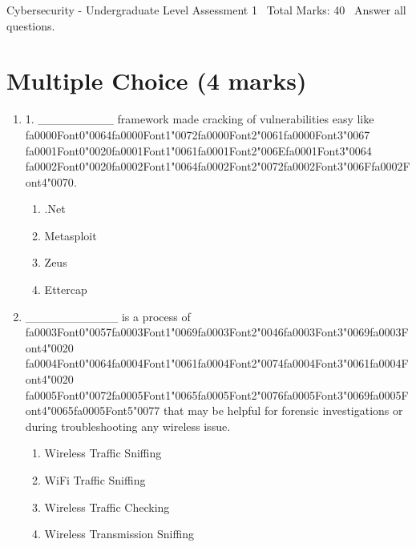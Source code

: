 \documentclass[12pt]{article}
\begin{document}
\begin{center}
Cybersecurity - Undergraduate Level Assessment 1 \
Total Marks: 40 \
Answer all questions.
\end{center}

\section*{Multiple Choice (4 marks)}
\begin{enumerate}[label=\arabic*.]
\item 1. \_\_\_\_\_\_\_\_\_ framework made cracking of vulnerabilities easy like {\csname fa0000Font0\endcsname\char"0064}{\csname fa0000Font1\endcsname\char"0072}{\csname fa0000Font2\endcsname\char"0061}{\csname fa0000Font3\endcsname\char"0067} {\csname fa0001Font0\endcsname\char"0020}{\csname fa0001Font1\endcsname\char"0061}{\csname fa0001Font2\endcsname\char"006E}{\csname fa0001Font3\endcsname\char"0064} {\csname fa0002Font0\endcsname\char"0020}{\csname fa0002Font1\endcsname\char"0064}{\csname fa0002Font2\endcsname\char"0072}{\csname fa0002Font3\endcsname\char"006F}{\csname fa0002Font4\endcsname\char"0070}.
\begin{enumerate}[label=(\alph*)]
    \item .Net
    \item Metasploit
    \item Zeus
    \item Ettercap
\end{enumerate}
\item \_\_\_\_\_\_\_\_\_\_\_ is a process of {\csname fa0003Font0\endcsname\char"0057}{\csname fa0003Font1\endcsname\char"0069}{\csname fa0003Font2\endcsname\char"0046}{\csname fa0003Font3\endcsname\char"0069}{\csname fa0003Font4\endcsname\char"0020} {\csname fa0004Font0\endcsname\char"0064}{\csname fa0004Font1\endcsname\char"0061}{\csname fa0004Font2\endcsname\char"0074}{\csname fa0004Font3\endcsname\char"0061}{\csname fa0004Font4\endcsname\char"0020} {\csname fa0005Font0\endcsname\char"0072}{\csname fa0005Font1\endcsname\char"0065}{\csname fa0005Font2\endcsname\char"0076}{\csname fa0005Font3\endcsname\char"0069}{\csname fa0005Font4\endcsname\char"0065}{\csname fa0005Font5\endcsname\char"0077} that may be helpful for forensic investigations or during troubleshooting any wireless issue.
\begin{enumerate}[label=(\alph*)]
    \item Wireless Traffic Sniffing
    \item WiFi Traffic Sniffing
    \item Wireless Traffic Checking
    \item Wireless Transmission Sniffing
\end{enumerate}
\end{enumerate}
\end{document}
